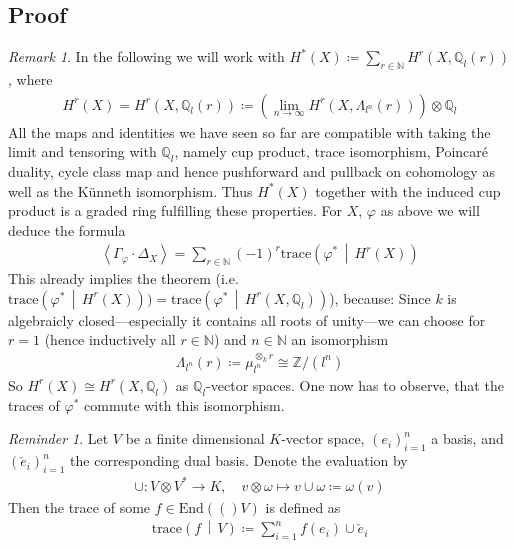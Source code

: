 \documentclass[english]{scrartcl}
\theoremstyle{definition}
\theoremstyle{remark}
\newtheorem{Rem}[Def]{Remark}
\newtheorem{Rev}[Def]{Reminder}
\newcommand*{\N}{\mathds{N}}
\newcommand*{\Z}{\mathds{Z}}
\newcommand*{\Q}{\mathds{Q}}
\newcommand*{\Zmod}[1]{\Z/#1} %
\newcommand*{\Zl}{\Z_l} %
\newcommand*{\Ql}{\Q_l} %
\newcommand*{\End}[1]{\text{End}(#1)} %
\newcommand*{\M}{\Lambda}
\newcommand*{\intProd}[2]{#1\cdot#2} %
\newcommand*{\intNum}[1]{\left\langle{#1}\right\rangle} %
\newcommand*{\Graph}[1]{\Gamma_{#1}} %
\newcommand*{\Diag}[1]{\Delta_{#1}} %
\newcommand*{\trace}[2]{\text{trace}\left(#1 \,\middle|\, #2 \right)} %
\renewcommand*{\phi}{\varphi}
\begin{document}
\subsection{Proof}
\begin{Rem}
  In the following we will work with
  $H^*(X)\coloneqq\sum_{r\in\N} H^r(X, \Ql(r))$, where
  \begin{gather*}
    H^r(X) = H^r(X,\Ql(r)) \coloneqq
    \left(\lim_{n\to\infty} H^r(X,\M_{l^n}(r))\right) \otimes \Ql
  \end{gather*}
  All the maps and identities we have seen so far are compatible with
  taking the limit and tensoring with $\Ql$, namely
  cup product,
  trace isomorphism,
  Poincaré duality,
  cycle class map and hence
  pushforward and pullback on cohomology as well as
  the Künneth isomorphism.
  Thus $H^*(X)$ together with the induced cup product is a graded ring
  fulfilling these properties.
  For $X$, $\phi$ as above we will deduce the formula
  \begin{gather*}
    \intNum{\intProd{\Graph{\phi}}{\Diag{X}}}
    = \sum_{r\in\N} (-1)^r \trace{\phi^*}{H^r(X)}
  \end{gather*}
  This already implies the theorem
  (i.e. $\trace{\phi^*}{H^r(X)})=\trace{\phi^*}{H^r(X,\Ql)}$),
  because:
  Since $k$ is algebraicly closed---especially it contains all
  roots of unity---we can choose for $r=1$ (hence inductively all
  $r\in\N$) and $n\in\N$ an isomorphism
  \begin{gather*}
    \M_{l^n}(r)\coloneqq\mu_{l^n}^{\otimes_k r} \cong \Zmod{(l^n)}
  \end{gather*}
  So $H^r(X)\cong H^r(X,\Ql)$ as $\Ql$-vector spaces.
  One now has to observe, that the traces of $\phi^*$ commute with
  this isomorphism.
\end{Rem} 

\begin{Rev}
  Let $V$ be a finite dimensional $K$-vector space, $(e_i)_{i=1}^n$ a basis,
  and $(\check e_i)_{i=1}^n$ the corresponding dual basis.
  Denote the evaluation by
  \begin{align*}
    \cup\colon V\otimes V^* \to K,\quad
    v\otimes \omega \mapsto v\cup\omega\coloneqq \omega(v)
  \end{align*}
  Then the trace of some $f\in\End(V)$ is defined as
  \begin{gather*}
    \trace{f}{V} \coloneqq \sum_{i=1}^n f(e_i)\cup \check e_i
  \end{gather*}
\end{Rev}
\end{document}
